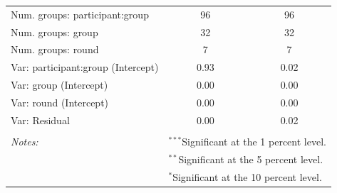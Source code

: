 \begin{table}[!htbp]
\begin{tabular}{@{\extracolsep{5pt}}lcc}
\hline
Num. groups: participant:group     & 96     &   96   \\
Num. groups: group               & 32      &    32  \\
Num. groups: round                         & 7   & 7        \\
\hline
Var: participant:group (Intercept) & 0.93   & 0.02     \\
Var: group (Intercept)           & 0.00   & 0.00     \\
Var: round (Intercept)           & 0.00    & 0.00    \\
Var: Residual                    & 0.00     &  0.02  \\
\hline
\hline \\[-1.8ex] 
\textit{Notes:} & \multicolumn{2}{l}{$^{***}$Significant at the 1 percent level.} \\ 
 & \multicolumn{2}{l}{$^{**}$Significant at the 5 percent level.} \\ 
 & \multicolumn{2}{l}{$^{*}$Significant at the 10 percent level.} \\ 
\end{tabular} 
\end{table} 